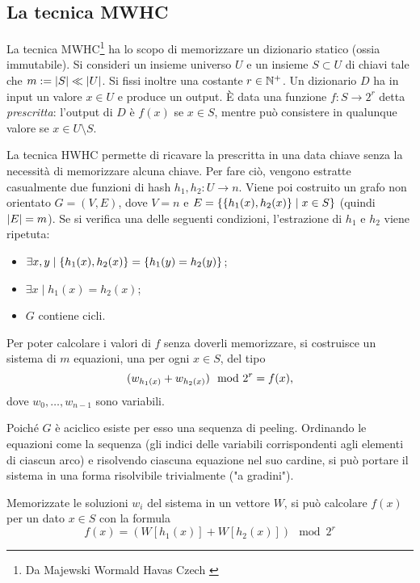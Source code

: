 \subsection{La tecnica MWHC}
La tecnica MWHC\footnote{Da Majewski Wormald Havas Czech \cite{Majewski:96:MWHC}} ha lo scopo di memorizzare un dizionario statico (ossia immutabile).
Si consideri un insieme universo $U$ e un insieme $S\subset U$ di chiavi tale che $m:=| S |\ll| U |$. Si fissi inoltre una costante $r\in\mathbb N^+$.
Un dizionario $D$ ha in input un valore $x\in U$ e produce un output.
È data una funzione $f:S\to 2^r$ detta \emph{prescritta}: l'output di $D$ è $f(x)$ se $x\in S$, mentre può consistere in qualunque valore se $x\in U\setminus S$.

La tecnica HWHC permette di ricavare la prescritta in una data chiave senza la necessità di memorizzare alcuna chiave. Per fare ciò, vengono estratte casualmente due funzioni di hash $h_1,h_2:U\to n$.
Viene poi costruito un grafo non orientato $G=(V,E)$, dove $V=n$ e $E=\left\{ \left\{ h_1(x),h_2(x) \right\}\mid x\in S \right\}$ (quindi $| E |=m$).
Se si verifica una delle seguenti condizioni, l'estrazione di $h_1$ e $h_2$ viene ripetuta:
\begin{itemize}
	\item $\exists x,y\mid \left\{ h_1(x),h_2(x) \right\}=\left\{ h_1(y)=h_2(y) \right\}$;
	\item $\exists x\mid h_1(x)=h_2(x)$;
	\item $G$ contiene cicli.
\end{itemize}

Per poter calcolare i valori di $f$ senza doverli memorizzare, si costruisce un sistema di $m$ equazioni, una per ogni $x\in S$, del tipo
\begin{equation*}
	(w_{h_1(x)} + w_{h_2(x)}) \mod 2^r = f(x) \text,
\end{equation*}
dove $w_0,\dots,w_{n-1}$ sono variabili.

Poiché $G$ è aciclico esiste per esso una sequenza di peeling. Ordinando le equazioni come la sequenza (gli indici delle variabili corrispondenti agli elementi di ciascun arco) e risolvendo ciascuna equazione nel suo cardine, si può portare il sistema in una forma risolvibile trivialmente ("a gradini").

Memorizzate le soluzioni $w_i$ del sistema in un vettore $W$, si può calcolare $f(x)$ per un dato $x\in S$ con la formula
\begin{equation*}
	f(x) = (W[h_1(x)] + W[h_2(x)]) \mod 2^r
\end{equation*}

